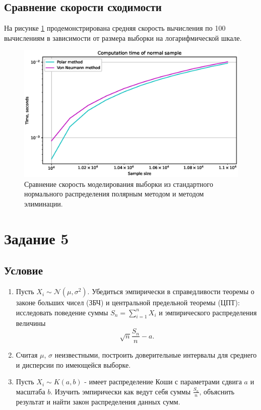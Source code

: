 \documentclass[11pt]{report}
\begin{document}
\subsection{Сравнение скорости сходимости}

На рисунке \ref{fig:norm-times} продемонстрирована средняя скорость вычисления по 100 вычислениям в зависимости от размера выборки на логарифмической шкале.

\begin{figure}[H]
    \centering
    \includegraphics[width=0.9\linewidth]{images/norm-times.eps}
    \caption{Сравнение скорость моделирования выборки из стандартного нормального распределения полярным методом и методом элиминации.}
    \label{fig:norm-times}
\end{figure}

\section{Задание 5}

\subsection{Условие}

\begin{enumerate}
\item Пусть $X_i\sim \mathcal{N}(\mu,\sigma^2)$. Убедиться эмпирически в справедливости теоремы о законе больших чисел (ЗБЧ) и центральной предельной теоремы (ЦПТ): исследовать поведение суммы $S_n = \sum\limits_{i=1}^n X_i$ и эмпирического распределения величины
$$
\sqrt{n}\dfrac{S_n}{n} - a.
$$
\item Считая $\mu$, $\sigma$ неизвестными, построить доверительные интервалы для среднего и дисперсии по имеющейся выборке.
\item Пусть $X_i \sim K(a,b)$ - имеет распределение Коши с параметрами сдвига $a$ и масштаба $b$. Изучить эмпирически как ведут себя суммы $\frac{S_n}{n}$, объяснить результат и найти закон распределения данных сумм.
\end{enumerate}
\end{document}

